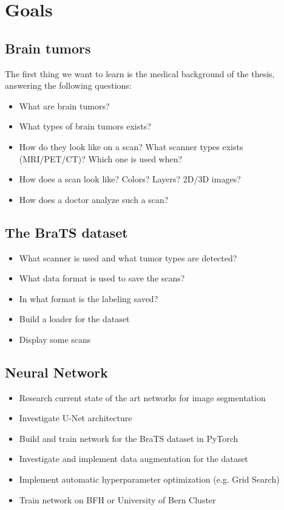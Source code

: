 \chapter{Goals}

\section{Brain tumors}
The first thing we want to learn is the medical background of the thesis, answering the following questions:
\begin{itemize}
    \item What are brain tumors?
    \item What types of brain tumors exists?
    \item How do they look like on a scan? What scanner types exists (MRI/PET/CT)? Which one is used when?
    \item How does a scan look like? Colors? Layers? 2D/3D images?
    \item How does a doctor analyze such a scan?
\end{itemize}

\section{The BraTS dataset}
\begin{itemize}
    \item What scanner is used and what tumor types are detected?
    \item What data format is used to save the scans?
    \item In what format is the labeling saved?
    \item Build a loader for the dataset
    \item Display some scans
\end{itemize}

\section{Neural Network}

\begin{itemize}
    \item Research current state of the art networks for image segmentation
    \item Investigate U-Net architecture
    \item Build and train network for the BraTS dataset in PyTorch
    \item Investigate and implement data augmentation for the dataset
    \item Implement automatic hyperparameter optimization (e.g. Grid Search)
    \item Train network on BFH or University of Bern Cluster
\end{itemize}

